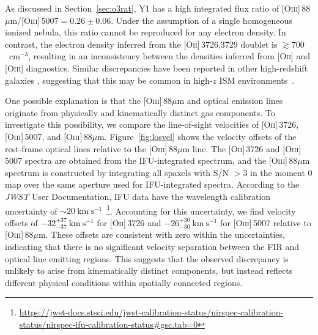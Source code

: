 \documentclass[trackchanges,twocolumn]{aastex701}
\newcommand{\ca}[1]{\textcolor{black}{#1}} %
\newcommand{\cc}[1]{\textcolor{black}{#1}} %
\newcommand{\ck}[1]{\textcolor{black}{#1}}
\newcommand{\cq}[1]{\textcolor{black}{#1}}
\begin{document}
As discussed in Section~\ref{sec:o3rat}, Y1 has a high integrated flux ratio of [\textsc{Oiii}]\,88$\mu$m/[\textsc{Oiii}]\,5007$ = 0.26 \pm 0.06$. Under the assumption of a single homogeneous ionized nebula, this ratio cannot be reproduced for any electron density.
In contrast, the electron density inferred from the [\textsc{Oii}]\,3726,3729 doublet is $\gtrsim700$~cm$^{-3}$, resulting in an inconsistency between the densities inferred from [\textsc{Oii}] and [\textsc{Oiii}] diagnostics. Similar discrepancies have been reported in other high-redshift galaxies \citep{Harikane2025,Usui2025}, suggesting that this may be common in \cc{high-$z$} ISM environments~\cq{\citep{Choustikov2026}}.

One possible explanation is that the [\textsc{Oiii}]\,88$\mu$m and optical emission lines originate from physically and kinematically distinct gas components. 
To investigate this possibility, we compare the line-of-sight velocities of [\textsc{Oii}]\,3726, [\textsc{Oiii}]\,5007, and [\textsc{Oiii}]\,88$\mu$m. Figure~\ref{fig:losvel} shows the velocity offsets of the rest-frame optical lines relative to the [\textsc{Oiii}]\,88$\mu$m line. The [\textsc{Oii}]\,3726 and [\textsc{Oiii}]\,5007 spectra are obtained from the IFU-integrated spectrum, and the [\textsc{Oiii}]\,88$\mu$m spectrum is constructed by integrating all spaxels with S/N $>3$ in the moment 0 map over the same aperture used for IFU-integrated spectra. According to the \textit{JWST} User Documentation, IFU data have the wavelength calibration uncertainty of $\sim 20~\mathrm{km~s^{-1}}$~\ca{\footnote{\url{https://jwst-docs.stsci.edu/jwst-calibration-status/nirspec-calibration-status/nirspec-ifu-calibration-status\#gsc.tab=0}}}. Accounting for this uncertainty, we find velocity offsets of \ck{$-32^{+37}_{-37}~\mathrm{km~s^{-1}}$} for  [\textsc{Oii}]\,3726 and $-26^{+30}_{-30}~\mathrm{km~s^{-1}}$ for [\textsc{Oiii}]\,5007 relative to [\textsc{Oiii}]\,88$\mu$m. These offsets are consistent with zero within the uncertainties, indicating that there is no significant velocity separation between the FIR and optical line emitting regions. This suggests that the observed discrepancy is unlikely to arise from kinematically distinct components, but instead reflects different physical conditions within spatially connected regions. 
\end{document}
